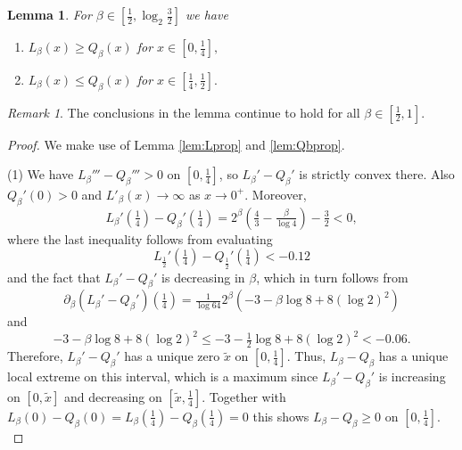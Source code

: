\documentclass[12pt]{amsart}
\theoremstyle{plain}
\newtheorem{lem}[thm]{Lemma}
\theoremstyle{definition}
\theoremstyle{remark}
\newtheorem{rem}[thm]{Remark}
\numberwithin{equation}{section}
\begin{document}
\begin{lem}\label{lem:LQmax}
For $\beta\in [\tfrac{1}{2},\log_2\frac32]$ we have
\begin{enumerate}
    \item $L_\beta(x) \ge Q_\beta(x)$ for $x\in [0,\tfrac14],$
    \item $L_\beta(x) \le Q_\beta(x)$ for  $x\in [\tfrac 14,\tfrac12].$
\end{enumerate}
\end{lem}
\begin{rem}
The conclusions in the lemma continue to hold for all $\beta\in [\frac12,1]$.
\end{rem}
\begin{proof}
    We make use of Lemma \ref{lem:Lprop} and  \ref{lem:Qbprop}.

    (1)  We have $L_\beta'''-Q_\beta'''> 0$ on $[0,\frac14]$,  
   so  $L_\beta'-Q_\beta'$ is strictly convex there. Also $Q_\beta'(0)>0$ and $L'_\beta(x)\to\infty$ as $x\to 0^+$. Moreover, 
    \[ L_\beta'(\tfrac{1}{4})-Q_\beta'(\tfrac{1}{4}) = 2^{\beta } ( \tfrac{4}{3}-\tfrac{\beta}{\log 4} )-\tfrac{3}{2} <0,\]
    where the last inequality  follows from evaluating
    \[L_{\frac{1}{2}}'(\tfrac{1}{4})-Q_{\frac{1}{2}}'(\tfrac{1}{4})<-0.12\]
   and the fact that   $L_\beta'-Q_\beta'$ is decreasing in $\beta$, which in turn follows from 
    \[\partial_\beta(L_\beta'-Q_\beta')(\tfrac{1}{4}) = \tfrac{1}{\log 64}2^\beta (-3 - \beta \log 8 + 8(\log 2)^2)\]
    and \[-3 - \beta \log 8 + 8(\log 2)^2 \leq -3 - \tfrac{1}{2} \log 8 + 8(\log 2)^2 <-0.06.\]
   Therefore, $L_\beta'-Q_\beta'$ has a unique zero $\tilde{x}$ on $[0,\tfrac{1}{4}]$. Thus, $L_\beta-Q_\beta$ has a unique local extreme on this interval, which is a maximum  since $L_\beta'-Q_\beta'$ is increasing on $[0,\tilde{x}]$ and decreasing on $[\tilde{x},\tfrac{1}{4}]$. Together with $L_\beta(0)-Q_\beta(0)=L_\beta(\tfrac{1}{4})-Q_\beta(\tfrac{1}{4})=0$ this shows $L_\beta-Q_\beta\geq 0$ on $[0,\tfrac{1}{4}]$. \\ 



\end{proof}
\end{document}
